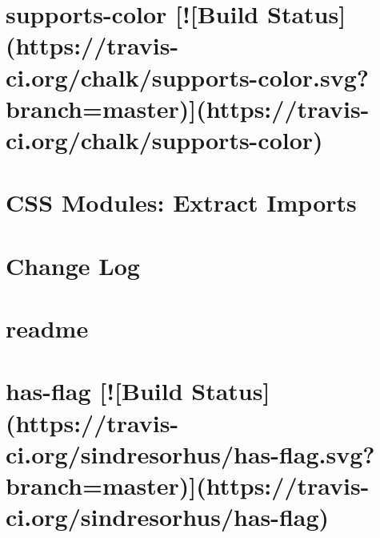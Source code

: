 \documentclass[twoside]{book}
\newcommand{\+}{\discretionary{\mbox{\scriptsize$\hookleftarrow$}}{}{}}
\begin{document}
\chapter{supports-\/color \mbox{[}!\mbox{[}Build Status\mbox{]}(https\+://travis-\/ci.org/chalk/supports-\/color.svg?branch=master)\mbox{]}(https\+://travis-\/ci.org/chalk/supports-\/color)}
\label{md__c_1_workspace_demo_src_main_script_node_modules_postcss-modules-extract-imports_node_modules_supports-color_readme}

\chapter{C\+SS Modules\+: Extract Imports}
\label{md__c_1_workspace_demo_src_main_script_node_modules_postcss-modules-extract-imports__r_e_a_d_m_e}

\chapter{Change Log}
\label{md__c_1_workspace_demo_src_main_script_node_modules_postcss-modules-local-by-default__c_h_a_n_g_e_l_o_g}

\chapter{readme}
\label{md__c_1_workspace_demo_src_main_script_node_modules_postcss-modules-local-by-default_node_modules_chalk_readme}

\chapter{has-\/flag \mbox{[}!\mbox{[}Build Status\mbox{]}(https\+://travis-\/ci.org/sindresorhus/has-\/flag.svg?branch=master)\mbox{]}(https\+://travis-\/ci.org/sindresorhus/has-\/flag)}
\label{md__c_1_workspace_demo_src_main_script_node_modules_postcss-modules-local-by-default_node_modules_has-flag_readme}

\end{document}
